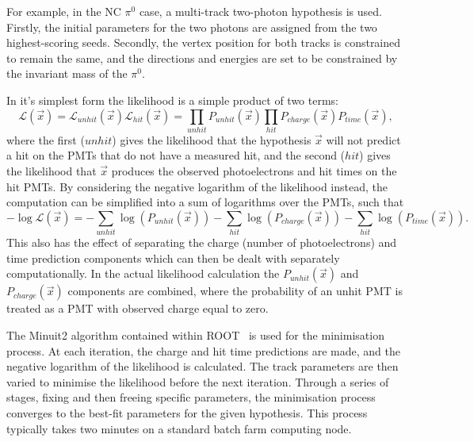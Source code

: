 For example, in the NC $\pi^{0}$ case, a multi-track two-photon hypothesis is used. Firstly, the
initial parameters for the two photons are assigned from the two highest-scoring seeds. Secondly,
the vertex position for both tracks is constrained to remain the same, and the directions and
energies are set to be constrained by the invariant mass of the $\pi^{0}$.

In it's simplest form the likelihood is a simple product of two terms:
\begin{equation} %
    \mathcal{L}(\vec{x})=\mathcal{L}_{unhit}(\vec{x})\mathcal{L}_{hit}(\vec{x})=
    \prod_{unhit}P_{unhit}(\vec{x})\prod_{hit}P_{charge}(\vec{x})P_{time}(\vec{x}),
    \label{eq:likelihood}
\end{equation}
where the first ($unhit$) gives the likelihood that the hypothesis $\vec{x}$ will not predict a
hit on the PMTs that do not have a measured hit, and the second ($hit$) gives the likelihood that
$\vec{x}$ produces the observed photoelectrons and hit times on the hit PMTs. By considering the
negative logarithm of the likelihood instead, the computation can be simplified into a sum of
logarithms over the PMTs, such that
\begin{equation} %
    -\log\mathcal{L}(\vec{x})=
    -\sum_{unhit}\log(P_{unhit}(\vec{x}))
    -\sum_{hit}\log(P_{charge}(\vec{x}))
    -\sum_{hit}\log(P_{time}(\vec{x})).
    \label{eq:likelihood_sum}
\end{equation}
This also has the effect of separating the charge (number of photoelectrons) and time prediction
components which can then be dealt with separately computationally. In the actual likelihood
calculation the $P_{unhit}(\vec{x})$ and $P_{charge}(\vec{x})$ components are combined, where the
probability of an unhit PMT is treated as a PMT with observed charge equal to zero.

The Minuit2 algorithm contained within ROOT~\cite{brun1997} is used for the minimisation process.
At each iteration, the charge and hit time predictions are made, and the negative logarithm of the
likelihood is calculated. The track parameters are then varied to minimise the likelihood before
the next iteration. Through a series of stages, fixing and then freeing specific parameters, the
minimisation process converges to the best-fit parameters for the given hypothesis. This process
typically takes two minutes on a standard batch farm computing node.

